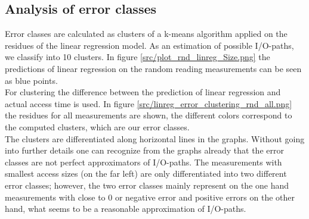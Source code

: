 \documentclass{superfri}
\begin{document}
\subsection{Analysis of error classes}
Error classes are calculated as clusters of a k-means algorithm applied on the residues of the linear regression model.
As an estimation of possible I/O-paths, we classify into 10 clusters.
In figure \ref{src/plot_rnd_linreg_Size.png} the predictions of linear regression on the random reading measurements can be seen as blue points.
\\
For clustering the difference between the prediction of linear regression and actual access time is used.
In figure \ref{src/linreg_error_clustering_rnd_all.png} the residues for all measurements are shown, the different colors correspond to the computed clusters, which are our error classes.
\\
The clusters are differentiated along horizontal lines in the graphs.
Without going into further details one can recognize from the graphs already that the error classes are not perfect approximators of I/O-paths.
The measurements with smallest access sizes (on the far left) are only differentiated into two different error classes; however, the two error classes mainly represent  on the one hand measurements with close to 0 or negative error and positive errors on the other hand, what seems to be a reasonable approximation of I/O-paths.\medskip
\end{document}
